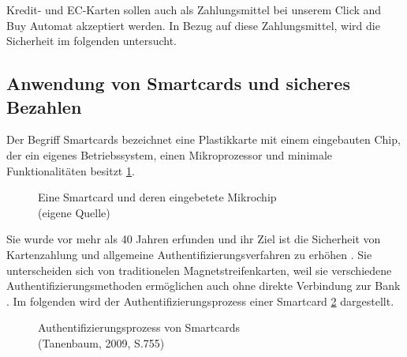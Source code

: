Kredit- und EC-Karten sollen auch als Zahlungsmittel bei unserem Click and Buy Automat
akzeptiert werden. In Bezug auf diese Zahlungsmittel, wird die Sicherheit im folgenden untersucht.


\subsection{Anwendung von Smartcards und sicheres Bezahlen}
Der Begriff Smartcards bezeichnet eine Plastikkarte mit einem eingebauten Chip, der ein eigenes 
Betriebssystem, einen Mikroprozessor und minimale Funktionalitäten besitzt \ref{fig:eigenes_Bild}. 

\vfill
\begin{figure}[H]
   \caption{Eine Smartcard und deren eingebetete Mikrochip\\(eigene Quelle)}
   \label{fig:eigenes_Bild}
\end{figure}
\vfill

Sie wurde vor mehr als 40 Jahren erfunden und ihr Ziel ist die Sicherheit von Kartenzahlung und allgemeine
Authentifizierungsverfahren zu erhöhen \cite{refip:JFSB}. Sie unterscheiden sich von traditionelen 
Magnetstreifenkarten, weil sie verschiedene Authentifizierungsmethoden ermöglichen auch ohne direkte 
Verbindung zur Bank \cite{refbook:ATMS}. Im folgenden wird der Authentifizierungsprozess einer Smartcard 
\ref{fig:refbook_ATMS} dargestellt. 


\vfill
\begin{figure}[H]
   \caption{Authentifizierungsprozess von Smartcards\\(Tanenbaum, 2009, S.755)}
   \label{fig:refbook_ATMS}
\end{figure}
\vfill

